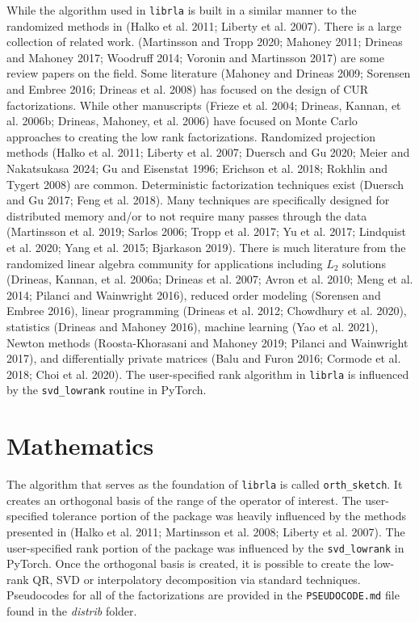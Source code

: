 \documentclass[
  12pt,
]{article}
\begin{document}
While the algorithm used in \texttt{librla} is built in a similar manner
to the randomized methods in (Halko et al. 2011; Liberty et al. 2007).
There is a large collection of related work. (Martinsson and Tropp 2020;
Mahoney 2011; Drineas and Mahoney 2017; Woodruff 2014; Voronin and
Martinsson 2017) are some review papers on the field. Some literature
(Mahoney and Drineas 2009; Sorensen and Embree 2016; Drineas et al.
2008) has focused on the design of CUR factorizations. While other
manuscripts (Frieze et al. 2004; Drineas, Kannan, et al. 2006b; Drineas,
Mahoney, et al. 2006) have focused on Monte Carlo approaches to creating
the low rank factorizations. Randomized projection methods (Halko et al.
2011; Liberty et al. 2007; Duersch and Gu 2020; Meier and Nakatsukasa
2024; Gu and Eisenstat 1996; Erichson et al. 2018; Rokhlin and Tygert
2008) are common. Deterministic factorization techniques exist (Duersch
and Gu 2017; Feng et al. 2018). Many techniques are specifically
designed for distributed memory and/or to not require many passes
through the data (Martinsson et al. 2019; Sarlos 2006; Tropp et al.
2017; Yu et al. 2017; Lindquist et al. 2020; Yang et al. 2015; Bjarkason
2019). There is much literature from the randomized linear algebra
community for applications including \(L_2\) solutions (Drineas, Kannan,
et al. 2006a; Drineas et al. 2007; Avron et al. 2010; Meng et al. 2014;
Pilanci and Wainwright 2016), reduced order modeling (Sorensen and
Embree 2016), linear programming (Drineas et al. 2012; Chowdhury et al.
2020), statistics (Drineas and Mahoney 2016), machine learning (Yao et
al. 2021), Newton methods (Roosta-Khorasani and Mahoney 2019; Pilanci
and Wainwright 2017), and differentially private matrices (Balu and
Furon 2016; Cormode et al. 2018; Choi et al. 2020). The user-specified
rank algorithm in \texttt{librla} is influenced by the
\texttt{svd\_lowrank} routine in PyTorch.

\section{Mathematics}\label{mathematics}

The algorithm that serves as the foundation of \texttt{librla} is called
\texttt{orth\_sketch}. It creates an orthogonal basis of the range of
the operator of interest. The user-specified tolerance portion of the
package was heavily influenced by the methods presented in (Halko et al.
2011; Martinsson et al. 2008; Liberty et al. 2007). The user-specified
rank portion of the package was influenced by the \texttt{svd\_lowrank}
in PyTorch. Once the orthogonal basis is created, it is possible to
create the low-rank QR, SVD or interpolatory decomposition via standard
techniques. Pseudocodes for all of the factorizations are provided in
the \texttt{PSEUDOCODE.md} file found in the \emph{distrib} folder.
\end{document}
